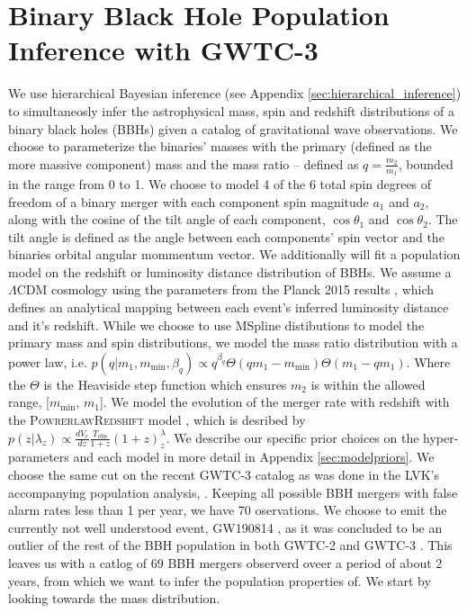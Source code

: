 \section{Binary Black Hole Population Inference with GWTC-3} \label{sec:results}

We use hierarchical Bayesian inference (see Appendix \ref{sec:hierarchical_inference}) to simultaneosly infer the astrophysical mass, spin and redshift distributions of 
a binary black holes (BBHs) given a catalog of gravitational wave observations. We choose to parameterize the binaries' masses with the primary (defined as the more massive component) mass 
and the mass ratio -- defined as $q=\frac{m_2}{m_1}$, bounded in the range from 0 to 1. We choose to model 4 of the 6 total 
spin degrees of freedom of a binary merger with each component spin magnitude $a_1$ and $a_2$, along with the cosine of the tilt angle of each component, 
$\cos{\theta_1}$ and $\cos{\theta_2}$. The tilt angle is defined as the angle between each components' spin vector and the binaries orbital angular mommentum vector. 
We additionally will fit a population model on the redshift or luminosity distance distribution of BBHs. We assume a $\Lambda\mathrm{CDM}$ cosmology using the 
parameters from the Planck 2015 results \cite{Planck2015}, which defines an analytical mapping between each event's inferred
luminosity distance and it's redshift. While we choose to use MSpline distibutions to model the primary mass and spin distributions, we 
model the mass ratio distribution with a power law, i.e. $p(q | m_1, m_\mathrm{min}, \beta_q) \propto q^{\beta_q} \Theta(qm_1 - m_\mathrm{min}) \Theta(m_1 - qm_1)$. 
Where the $\Theta$ is the Heaviside step function which ensures $m_2$ is within the allowed range, [$m_\mathrm{min}$, $m_1$].
We model the evolution of the merger rate with redshift with the \textsc{PowrerlawRedshift} model \cite{Fishbach_2018redshift}, which is desribed by 
$p(z|\lambda_z)\propto \frac{dV_c}{dz} \frac{T_\mathrm{obs}}{1+z} (1+z)^\lambda_z$. We describe our specific prior choices on the hyper-parameters and each model 
in more detail in Appendix \ref{sec:modelpriors}. We choose the same cut on the recent GWTC-3 catalog as was done in the LVK's accompanying population analysis, .
Keeping all possible BBH mergers with false alarm rates less than 1 per year, we have 70 oservations. We choose to emit the currently not well understood event, GW190814 \cite{190814disc},
as it was concluded to be an outlier of the rest of the BBH population in both GWTC-2 and GWTC-3 \cite{o3a_pop}. This leaves us with a catlog of 69 BBH mergers observerd oveer a period of about 2 years, from
which we want to infer the population properties of. We start by looking towards the mass distribution.

